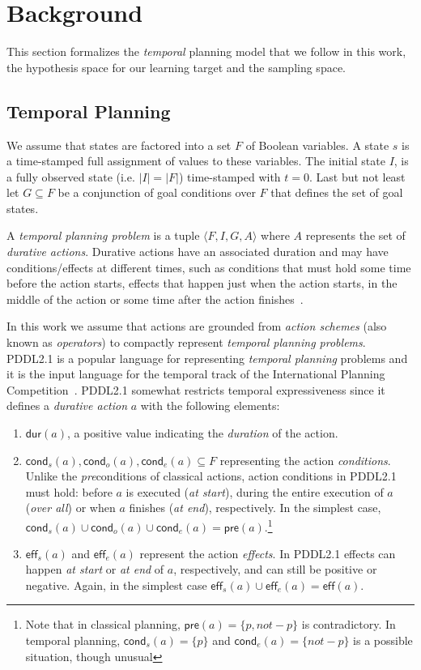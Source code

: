 \documentclass{ecai}
\newcommand{\tup}[1]{{\langle #1 \rangle}}
\newcommand{\pre}{\mathsf{pre}}    %
\newcommand{\eff}{\mathsf{eff}}    %
\newcommand{\cond}{\mathsf{cond}}  %
\newcommand{\dur}{\mathsf{dur}}    %
\begin{document}
\section{Background}
This section formalizes the {\em temporal} planning model that we follow in this work, the hypothesis space for our learning target and the sampling space.

\subsection{Temporal Planning}
\label{sec:temporalplanning}
We assume that states are factored into a set $F$ of Boolean variables. A state $s$ is a time-stamped full assignment of values to these variables. The initial state $I$, is a fully observed state (i.e. $|I|=|F|$) time-stamped with $t=0$. Last but not least let $G \subseteq F$ be a conjunction of goal conditions over $F$ that defines the set of goal states.

A {\em temporal planning problem} is a tuple $\tup{F,I,G,A}$ where $A$ represents the set of {\em durative actions}. Durative actions have an associated duration and may have conditions/effects at different times, such as conditions that must hold some time before the action starts, effects that happen just when the action starts, in the middle of the action or some time after the action finishes~\cite{garrido2009constraint}.

In this work we assume that actions are grounded from {\em action schemes} (also known as {\em operators}) to compactly represent {\em temporal planning problems}. PDDL2.1 is a popular language for representing {\em temporal planning} problems and it is the input language for the temporal track of the International Planning Competition~\cite{fox2003pddl2,ghallab2004automated}. PDDL2.1 somewhat restricts temporal expressiveness since it defines a {\em durative action} $a$ with the following elements:
\begin{enumerate}
\item $\dur(a)$, a positive value indicating the {\em duration} of the action.
\item $\cond_s(a), \cond_o(a), \cond_e(a) \subseteq F$ representing the action {\em conditions}. Unlike the \emph{pre}conditions of classical actions, action conditions in PDDL2.1 must hold: before $a$ is executed ({\em at start}), during the entire execution of $a$ ({\em over all}) or when $a$ finishes ({\em at end}), respectively. In the simplest case, $\cond_s(a) \cup \cond_o(a) \cup \cond_e(a) = \pre(a).$\footnote{Note that in classical planning, $\pre(a)=\{p,not-p\}$ is contradictory. In temporal planning, $\cond_s(a)=\{p\}$ and $\cond_e(a)=\{not-p\}$ is a possible situation, though unusual}
\item $\eff_s(a)$ and $\eff_e(a)$ represent the action {\em effects}. In PDDL2.1 effects can happen {\em at start} or {\em at end} of $a$, respectively, and can still be positive or negative. Again, in the simplest case $\eff_s(a) \cup \eff_e(a) = \eff(a)$.
\end{enumerate}
\end{document}
